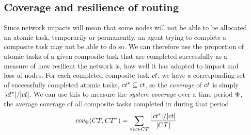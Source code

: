 \subsection{Coverage and resilience of routing}
\newcommand{\functionSystemCoverage}[2]{
	\functionSignature{cov_{\setTime{}{}}}{\setCompositeTask{}{}, \setCompositeTask{}{*}}
}
Since network impacts will mean that some nodes will not be able to be allocated an atomic task, temporarily or permanently, an agent trying to complete a composite task may not be able to do so. We can therefore use the proportion of atomic tasks of a given composite task that are completed successfully as a measure of how resilient the network is, how well it has adapted to impact and loss of nodes. For each completed composite task $\varCompositeTask{}{}$, we have a corresponding set of successfully completed atomic tasks, $\varCompositeTask{}{*} \subseteq \varCompositeTask{}{}$, so the \textit{coverage} of $\varCompositeTask{}{}$ is simply  $\funcSize{\varCompositeTask{}{*}}/\funcSize{\varCompositeTask{}{}}$. We can use this to measure the \textit{system coverage} over a time period $\Phi$, the average coverage of all composite tasks completed in during that period
\begin{equation}
	\label{eq:coverage}
	\functionSystemCoverage{}{} = \sum\limits_{\forall \varCompositeTask{}{} \in \setCompositeTask{}{}} \frac{ \funcSize{\varCompositeTask{}{*}}/\funcSize{\varCompositeTask{}{}}}{\funcSize{\setCompositeTask{}{}}{}}
\end{equation}

